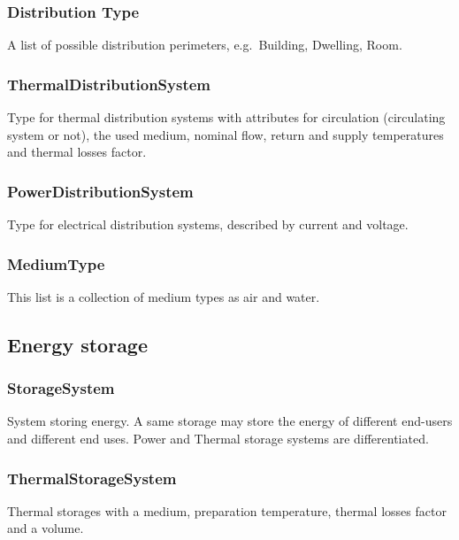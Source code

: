 \documentclass[a4paper,12pt]{article}
\begin{document}
\subsubsection{Distribution Type}\label{distribution-type}

A list of possible distribution perimeters, e.g.~Building, Dwelling,
Room.

\subsubsection{ThermalDistributionSystem}\label{thermaldistributionsystem}

Type for thermal distribution systems with attributes for circulation
(circulating system or not), the used medium, nominal flow, return and
supply temperatures and thermal losses factor.

\subsubsection{PowerDistributionSystem}\label{powerdistributionsystem}

Type for electrical distribution systems, described by current and
voltage.

\subsubsection{MediumType}\label{mediumtype}

This list is a collection of medium types as air and water.

\subsection{Energy storage}\label{energy-storage}

\subsubsection{StorageSystem}\label{storagesystem}

System storing energy. A same storage may store the energy of different
end-users and different end uses. Power and Thermal storage systems are
differentiated.

\subsubsection{ThermalStorageSystem}\label{thermalstoragesystem}

Thermal storages with a medium, preparation temperature, thermal losses
factor and a volume.
\end{document}
